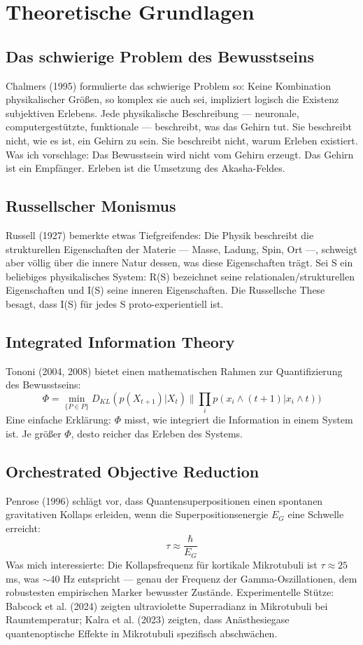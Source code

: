 \documentclass[11pt,a4paper]{article}
\begin{document}
\section{Theoretische Grundlagen}
\subsection{Das schwierige Problem des Bewusstseins}
Chalmers (1995) formulierte das schwierige Problem so: Keine Kombination physikalischer Größen, so komplex sie auch sei, impliziert logisch die Existenz subjektiven Erlebens. Jede physikalische Beschreibung --- neuronale, computergestützte, funktionale --- beschreibt, was das Gehirn tut. Sie beschreibt nicht, wie es ist, ein Gehirn zu sein. Sie beschreibt nicht, warum Erleben existiert. Was ich vorschlage: Das Bewusstsein wird nicht vom Gehirn erzeugt. Das Gehirn ist ein Empfänger. Erleben ist die Umsetzung des Akasha-Feldes.

\subsection{Russellscher Monismus}
Russell (1927) bemerkte etwas Tiefgreifendes: Die Physik beschreibt die strukturellen Eigenschaften der Materie --- Masse, Ladung, Spin, Ort ---, schweigt aber völlig über die innere Natur dessen, was diese Eigenschaften trägt. Sei S ein beliebiges physikalisches System: R(S) bezeichnet seine relationalen/strukturellen Eigenschaften und I(S) seine inneren Eigenschaften. Die Russellsche These besagt, dass I(S) für jedes S proto-experientiell ist.

\subsection{Integrated Information Theory}
Tononi (2004, 2008) bietet einen mathematischen Rahmen zur Quantifizierung des Bewusstseins:
\begin{equation}
\Phi = \min_{\{P \in P\}} D_{KL}(p(X_{t+1})|X_{t}) \parallel \prod_{i} p(x_{i} \land (t+1)|x_{i} \land t))
\end{equation}
Eine einfache Erklärung: $\Phi$ misst, wie integriert die Information in einem System ist. Je größer $\Phi$, desto reicher das Erleben des Systems.

\subsection{Orchestrated Objective Reduction}
Penrose (1996) schlägt vor, dass Quantensuperpositionen einen spontanen gravitativen Kollaps erleiden, wenn die Superpositionsenergie $E_G$ eine Schwelle erreicht:
\begin{equation}
\tau \approx \frac{\hbar}{E_G}
\end{equation}
Was mich interessierte: Die Kollapsfrequenz für kortikale Mikrotubuli ist $\tau \approx 25$ ms, was $\sim 40$ Hz entspricht --- genau der Frequenz der Gamma-Oszillationen, dem robustesten empirischen Marker bewusster Zustände. Experimentelle Stütze: Babcock et al. (2024) zeigten ultraviolette Superradianz in Mikrotubuli bei Raumtemperatur; Kalra et al. (2023) zeigten, dass Anästhesiegase quantenoptische Effekte in Mikrotubuli spezifisch abschwächen.
\end{document}
